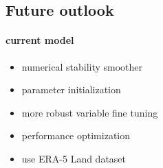 \documentclass{article}
\let\Oldsubsection\subsection
\renewcommand{\subsection}{\FloatBarrier\Oldsubsection}
\begin{document}







\subsection{Future outlook}

\paragraph{current model}
\begin{itemize}
    \item numerical stability smoother
    \item parameter initialization 
    \item more robust variable fine tuning
    \item performance optimization
    \item use ERA-5 Land dataset
\end{itemize}
\end{document}
